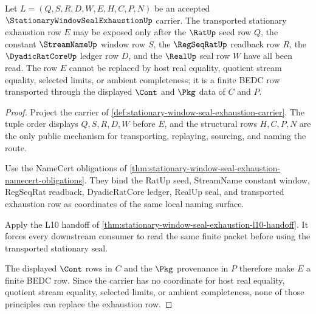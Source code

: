 \begin{theorem}
\label{thm:stationary-window-seal-exhaustion-exhaustion-row-obligations}
Let $L=(Q,S,R,D,W,E,H,C,P,N)$ be an accepted $\StationaryWindowSealExhaustionUp$ carrier. The transported stationary exhaustion row $E$ may be exposed only after the $\RatUp$ seed row $Q$, the constant $\StreamNameUp$ window row $S$, the $\RegSeqRatUp$ readback row $R$, the $\DyadicRatCoreUp$ ledger row $D$, and the $\RealUp$ seal row $W$ have all been read. The row $E$ cannot be replaced by host real equality, quotient stream equality, selected limits, or ambient completeness; it is a finite BEDC row transported through the displayed $\Cont$ and $\Pkg$ data of $C$ and $P$.
\end{theorem}
\begin{proof}
Project the carrier of \autoref{def:stationary-window-seal-exhaustion-carrier}. The tuple order displays $Q,S,R,D,W$ before $E$, and the structural rows $H,C,P,N$ are the only public mechanism for transporting, replaying, sourcing, and naming the route.

Use the NameCert obligations of \autoref{thm:stationary-window-seal-exhaustion-namecert-obligations}. They bind the RatUp seed, StreamName constant window, RegSeqRat readback, DyadicRatCore ledger, RealUp seal, and transported exhaustion row as coordinates of the same local naming surface.

Apply the L10 handoff of \autoref{thm:stationary-window-seal-exhaustion-l10-handoff}. It forces every downstream consumer to read the same finite packet before using the transported stationary seal.

The displayed $\Cont$ rows in $C$ and the $\Pkg$ provenance in $P$ therefore make $E$ a finite BEDC row. Since the carrier has no coordinate for host real equality, quotient stream equality, selected limits, or ambient completeness, none of those principles can replace the exhaustion row.
\end{proof}

